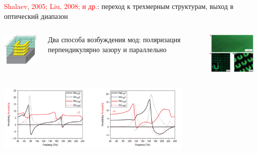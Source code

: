 \documentclass[9pt, compress, xcolor=table]{beamer}
\begin{document}
\begin{frame}{}

{\scriptsize \textcolor{red}{Shalaev, 2005; Liu, 2008; и др.}: переход к трехмерным структурам,
выход в оптический диапазон}
\begin{columns}[c]
\column{6cm}
\begin{center}
\includegraphics[width=3cm]{neg_ref_34}
\end{center}
{\tiny Два способа возбуждения мод: поляризация перпендикулярно зазору и параллельно}

\column{6cm}
\begin{center}
\includegraphics[width=4cm]{neg_ref_36}
\end{center}
\end{columns}
\begin{center}
\includegraphics[width=9.5cm]{neg_ref_37}
\end{center}

\end{frame}
\end{document}
